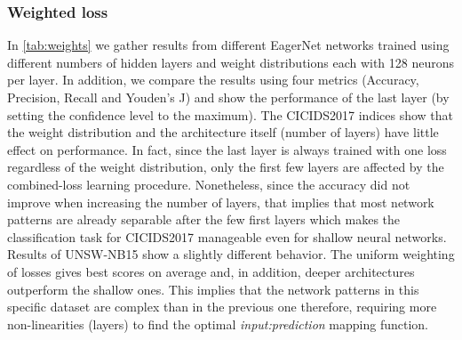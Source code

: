 \documentclass[conference]{IEEEtran}
\newcommand{\mynote}[3]{
    \fbox{\bfseries\sffamily\scriptsize#1}
    {\small$\blacktriangleright$\textsf{\emph{\color{#3}{#2}}}$\blacktriangleleft$}}
\newcommand{\todo}[1]{\mynote{TODO}{#1}{red}}
\begin{document}
\subsubsection{Weighted loss}
In \autoref{tab:weights} we gather results from different EagerNet networks trained using different numbers of hidden layers and weight distributions each with 128 neurons per layer. In addition, we compare the results using four metrics (Accuracy, Precision, Recall and Youden's J) and show the performance of the last layer (by setting the confidence level to the maximum). The CICIDS2017 indices %
show that the weight distribution and the architecture itself (number of layers) have little effect on performance. In fact, since the last layer is always trained with one loss regardless of the weight distribution, only the first few layers are affected by the combined-loss learning procedure. Nonetheless, since the accuracy did not improve when increasing the number of layers, that implies that most network patterns are already separable after the few first layers which makes the classification task for CICIDS2017 manageable even for shallow neural networks. Results of UNSW-NB15 show a slightly different behavior. %
The uniform weighting of losses gives best scores on average and, in addition, deeper architectures outperform the shallow ones. This implies that the network patterns in this specific dataset are complex than in the previous one therefore, requiring more non-linearities (layers) to find the optimal \emph{input:prediction} mapping function.
\end{document}
